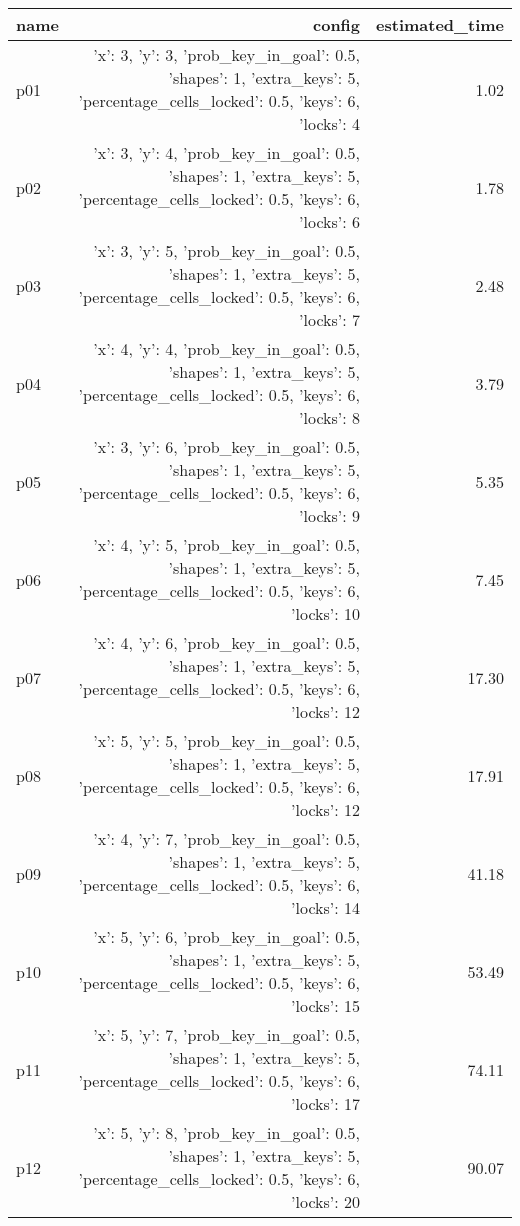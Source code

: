 \documentclass{article}
\begin{document}
                            \begin{center}
                            \scriptsize
                            \begin{tabular}{@{}l|r|r@{}}
                            name & config & estimated\_time\\\midrule
                              p01&{'x': 3, 'y': 3, 'prob\_key\_in\_goal': 0.5, 'shapes': 1, 'extra\_keys': 5, 'percentage\_cells\_locked': 0.5, 'keys': 6, 'locks': 4}&1.02\\
  p02&{'x': 3, 'y': 4, 'prob\_key\_in\_goal': 0.5, 'shapes': 1, 'extra\_keys': 5, 'percentage\_cells\_locked': 0.5, 'keys': 6, 'locks': 6}&1.78\\
  p03&{'x': 3, 'y': 5, 'prob\_key\_in\_goal': 0.5, 'shapes': 1, 'extra\_keys': 5, 'percentage\_cells\_locked': 0.5, 'keys': 6, 'locks': 7}&2.48\\
  p04&{'x': 4, 'y': 4, 'prob\_key\_in\_goal': 0.5, 'shapes': 1, 'extra\_keys': 5, 'percentage\_cells\_locked': 0.5, 'keys': 6, 'locks': 8}&3.79\\
  p05&{'x': 3, 'y': 6, 'prob\_key\_in\_goal': 0.5, 'shapes': 1, 'extra\_keys': 5, 'percentage\_cells\_locked': 0.5, 'keys': 6, 'locks': 9}&5.35\\
  p06&{'x': 4, 'y': 5, 'prob\_key\_in\_goal': 0.5, 'shapes': 1, 'extra\_keys': 5, 'percentage\_cells\_locked': 0.5, 'keys': 6, 'locks': 10}&7.45\\
  p07&{'x': 4, 'y': 6, 'prob\_key\_in\_goal': 0.5, 'shapes': 1, 'extra\_keys': 5, 'percentage\_cells\_locked': 0.5, 'keys': 6, 'locks': 12}&17.30\\
  p08&{'x': 5, 'y': 5, 'prob\_key\_in\_goal': 0.5, 'shapes': 1, 'extra\_keys': 5, 'percentage\_cells\_locked': 0.5, 'keys': 6, 'locks': 12}&17.91\\
  p09&{'x': 4, 'y': 7, 'prob\_key\_in\_goal': 0.5, 'shapes': 1, 'extra\_keys': 5, 'percentage\_cells\_locked': 0.5, 'keys': 6, 'locks': 14}&41.18\\
  p10&{'x': 5, 'y': 6, 'prob\_key\_in\_goal': 0.5, 'shapes': 1, 'extra\_keys': 5, 'percentage\_cells\_locked': 0.5, 'keys': 6, 'locks': 15}&53.49\\
  p11&{'x': 5, 'y': 7, 'prob\_key\_in\_goal': 0.5, 'shapes': 1, 'extra\_keys': 5, 'percentage\_cells\_locked': 0.5, 'keys': 6, 'locks': 17}&74.11\\
  p12&{'x': 5, 'y': 8, 'prob\_key\_in\_goal': 0.5, 'shapes': 1, 'extra\_keys': 5, 'percentage\_cells\_locked': 0.5, 'keys': 6, 'locks': 20}&90.07\\

\end{tabular}
\end{center}
\end{document}
